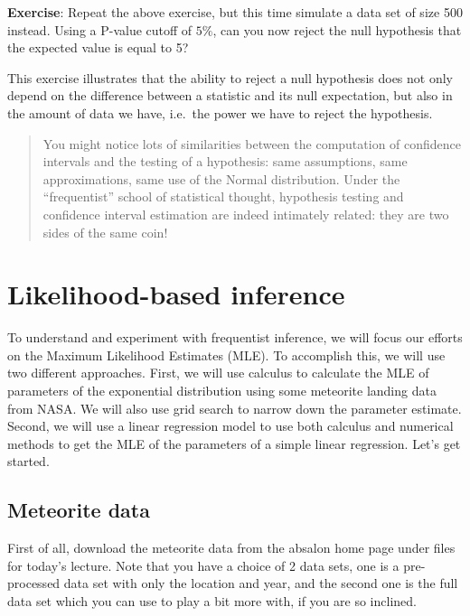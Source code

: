 \documentclass[
]{book}
\begin{document}
\textbf{Exercise}: Repeat the above exercise, but this time simulate a data set of size 500 instead. Using a P-value cutoff of \(5\%\), can you now reject the null hypothesis that the expected value is equal to 5?

This exercise illustrates that the ability to reject a null hypothesis does not only depend on the difference between a statistic and its null expectation, but also in the amount of data we have, i.e.~the power we have to reject the hypothesis.

\begin{quote}
You might notice lots of similarities between the computation of confidence intervals and the testing of a hypothesis: same assumptions, same approximations, same use of the Normal distribution. Under the ``frequentist'' school of statistical thought, hypothesis testing and confidence interval estimation are indeed intimately related: they are two sides of the same coin!
\end{quote}

\hypertarget{likelihood-based-inference}{%
\chapter{Likelihood-based inference}\label{likelihood-based-inference}}

To understand and experiment with frequentist inference, we will focus our efforts on the Maximum Likelihood Estimates (MLE). To accomplish this, we will use two different approaches. First, we will use calculus to calculate the MLE of parameters of the exponential distribution using some meteorite landing data from NASA. We will also use grid search to narrow down the parameter estimate. Second, we will use a linear regression model to use both calculus and numerical methods to get the MLE of the parameters of a simple linear regression. Let's get started.

\hypertarget{meteorite-data}{%
\section{Meteorite data}\label{meteorite-data}}

First of all, download the meteorite data from the absalon home page under files for today's lecture. Note that you have a choice of 2 data sets, one is a pre-processed data set with only the location and year, and the second one is the full data set which you can use to play a bit more with, if you are so inclined.
\end{document}

